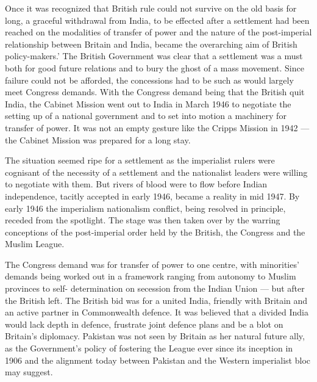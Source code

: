 \begin{multicols}{2}
Once it was recognized that British rule could not survive on the old basis for long, a graceful withdrawal from India, to be effected after a settlement had been reached on the modalities of transfer of power and the nature of the post-imperial relationship between Britain and India, became the overarching aim of British policy-makers.' The British Government was clear that a settlement was a must both for good future relations and to bury the ghost of a mass movement. Since failure could not be afforded, the concessions had to be such as would largely meet Congress demands. With the Congress demand being that the British quit India, the Cabinet Mission went out to India in March 1946 to negotiate the setting up of a national government and to set into motion a machinery for transfer of power. It was not an empty gesture like the Cripps Mission in 1942 --- the Cabinet Mission was prepared for a long stay. 

The situation seemed ripe for a settlement as the imperialist rulers were cognisant of the necessity of a settlement and the nationalist leaders were willing to negotiate with them. But rivers of blood were to flow before Indian independence, tacitly accepted in early 1946, became a reality in mid 1947. By early 1946 the imperialism nationalism conflict, being resolved in principle, receded from the spotlight. The stage was then taken over by the warring conceptions of the post-imperial order held by the British, the Congress and the Muslim League. 

The Congress demand was for transfer of power to one centre, with minorities' demands being worked out in a framework ranging from autonomy to Muslim provinces to self- determination on secession from the Indian Union --- but after the British left. The British bid was for a united India, friendly with Britain and an active partner in Commonwealth defence. It was believed that a divided India would lack depth in defence, frustrate joint defence plans and be a blot on Britain's diplomacy. Pakistan was not seen by Britain as her natural future ally, as the Government's policy of fostering the League ever since its inception in 1906 and the alignment today between Pakistan and the Western imperialist bloc may suggest. 


\end{multicols}
